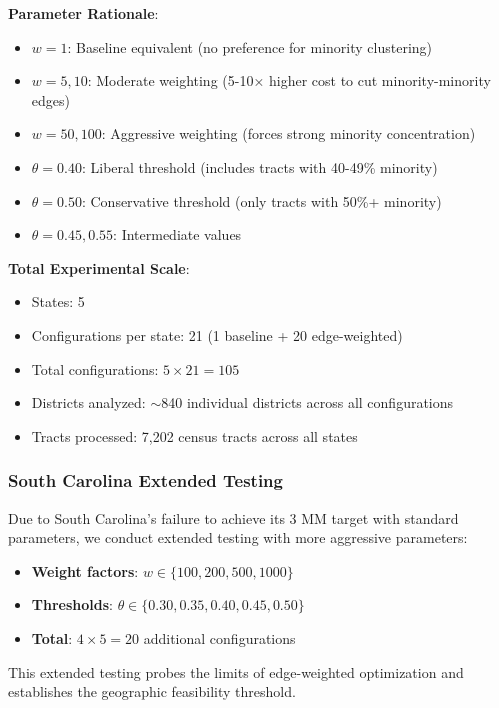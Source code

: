 \textbf{Parameter Rationale}:
\begin{itemize}
    \item \textbf{$w = 1$}: Baseline equivalent (no preference for minority clustering)
    \item \textbf{$w = 5, 10$}: Moderate weighting (5-10× higher cost to cut minority-minority edges)
    \item \textbf{$w = 50, 100$}: Aggressive weighting (forces strong minority concentration)
    \item \textbf{$\theta = 0.40$}: Liberal threshold (includes tracts with 40-49\% minority)
    \item \textbf{$\theta = 0.50$}: Conservative threshold (only tracts with 50\%+ minority)
    \item \textbf{$\theta = 0.45, 0.55$}: Intermediate values
\end{itemize}

\textbf{Total Experimental Scale}:
\begin{itemize}
    \item States: 5
    \item Configurations per state: 21 (1 baseline + 20 edge-weighted)
    \item Total configurations: $5 \times 21 = 105$
    \item Districts analyzed: $\sim$840 individual districts across all configurations
    \item Tracts processed: 7,202 census tracts across all states
\end{itemize}

\subsubsection{South Carolina Extended Testing}

Due to South Carolina's failure to achieve its 3 MM target with standard parameters, we conduct extended testing with more aggressive parameters:
\begin{itemize}
    \item \textbf{Weight factors}: $w \in \{100, 200, 500, 1000\}$
    \item \textbf{Thresholds}: $\theta \in \{0.30, 0.35, 0.40, 0.45, 0.50\}$
    \item \textbf{Total}: $4 \times 5 = 20$ additional configurations
\end{itemize}

This extended testing probes the limits of edge-weighted optimization and establishes the geographic feasibility threshold.


